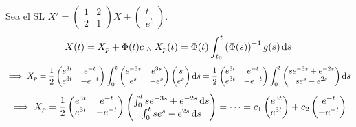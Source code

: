 \begin{ejem}
	Sea el SL $X' = \begin{pmatrix}
			1 & 2 \\
			2 & 1
		\end{pmatrix} X + \begin{pmatrix}
			t \\
			e^t
		\end{pmatrix}$.
	\[X(t) = X_p + \Phi(t) c \we X_p(t) = \Phi(t) \int_{t_0}^{t} \left(\Phi(s)\right)^{-1} g(s) \odif{s}\]
	\[\implies X_p = \frac{1}{2} \begin{pmatrix}
			e^{3t} & e^{-t}  \\
			e^{3t} & -e^{-t}
		\end{pmatrix} \int_{0}^{t} \begin{pmatrix}
			e^{-3s} & e^{3s} \\
			e^{s}   & -e^{s}
		\end{pmatrix} \begin{pmatrix}
			s \\
			e^s
		\end{pmatrix} \odif{s} = \frac{1}{2} \begin{pmatrix}
			e^{3t} & e^{-t}  \\
			e^{3t} & -e^{-t}
		\end{pmatrix} \int_{0}^{t} \begin{pmatrix}
			s e^{-3s} + e^{-2s} \\
			s e^{s} - e^{2s}    \\
		\end{pmatrix} \odif{s}\]
	\[\implies X_p = \frac{1}{2} \begin{pmatrix}
			e^{3t} & e^{-t}  \\
			e^{3t} & -e^{-t}
		\end{pmatrix} \begin{pmatrix}
			\int_{0}^{t} s e^{-3s} + e^{-2s} \odif{s} \\
			\int_{0}^{t} s e^{s} - e^{2s} \odif{s}
		\end{pmatrix} = \cdots = c_1 \begin{pmatrix}
			e^{3t} \\
			e^{3t}
		\end{pmatrix} + c_2 \begin{pmatrix}
			e^{-t} \\
			-e^{-t}
		\end{pmatrix}\]
\end{ejem}

